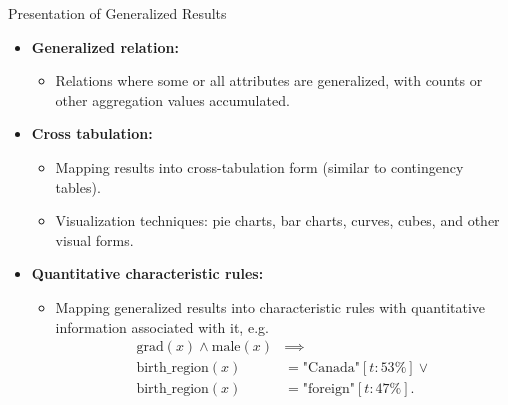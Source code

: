 \begin{frame}{Presentation of Generalized Results}
	\begin{itemize}
		\item \textbf{Generalized relation:}
		      \begin{itemize}
			      \item Relations where some or all attributes are generalized, with counts or other aggregation values accumulated.
		      \end{itemize}
		\item \textbf{Cross tabulation:}
		      \begin{itemize}
			      \item Mapping results into cross-tabulation form (similar to contingency tables).
			      \item Visualization techniques: pie charts, bar charts, curves, cubes, and other visual forms.
		      \end{itemize}
		\item \textbf{Quantitative characteristic rules:}
		      \begin{itemize}
			      \item Mapping generalized results into characteristic rules with quantitative information associated with it, e.g.
			            \begin{align}
				            \text{grad}(x) \wedge \text{male}(x) & \implies                       \\
				            \text{birth\_region}(x)              & = \text{"Canada"}[t:53\%] \lor \\
				            \text{birth\_region}(x)              & = \text{"foreign"}[t:47\%].
			            \end{align}
		      \end{itemize}
	\end{itemize}
\end{frame}

